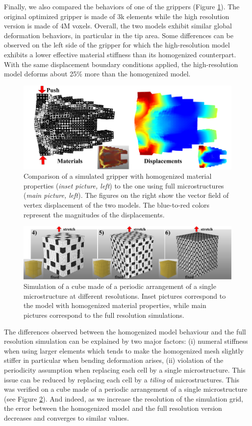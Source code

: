 Finally, we also compared the behaviors of one of the grippers (Figure \ref{fig:gripper_validate}). The original optimized gripper is made of 3k elements while the high resolution version is made of 4M voxels.
Overall, the two models exhibit similar global deformation behaviors, in particular in the tip area. Some differences can be observed on the left side of the gripper for which the high-resolution model exhibits a lower effective material stiffness than its homogenized counterpart. With the same displacement boundary conditions applied, the high-resolution model deforms about 25\% more than the homogenized model.
	
	\begin{figure}[t]
		\centering
		\includegraphics[width=.6\linewidth]{images/gripper_cmp.png}	
		\caption{Comparison of a simulated gripper with homogenized material properties (\emph{inset picture, left}) to the one using full microstructures (\emph{main picture, left}). The figures on the right show the vector field of vertex displacement of the two models. The blue-to-red colors represent the magnitudes of the displacements.}
			\label{fig:gripper_validate}
	\end{figure}
	
	\begin{figure}[h]
		\centering
		\includegraphics[width=.6\linewidth]{images/hom_cube_peri.png}	
		\caption{Simulation of a cube made of a periodic arrangement of a single microstructure at different resolutions. Inset pictures correspond to the model with homogenized material properties, while main pictures correspond to the full resolution simulations.}
			\label{fig:hom_cube_1}
	\end{figure}
	
The differences observed between the homogenized model behaviour and the full resolution simulation can be explained by two major factors: (i) numeral stiffness when using larger elements which tends to make the homogenized mesh slightly stiffer in particular when bending deformation arises, (ii) violation of the periodicity assumption when replacing each cell by a single microstructure. This issue can be reduced by replacing each cell by a {\it tiling} of microstructures. This was verified on a cube made of a periodic arrangement of a single microstructure (see Figure \ref{fig:hom_cube_1}). And indeed, as we increase the resolution of the simulation grid, the error between the homogenized model and the full resolution version decreases and converges to similar values.

